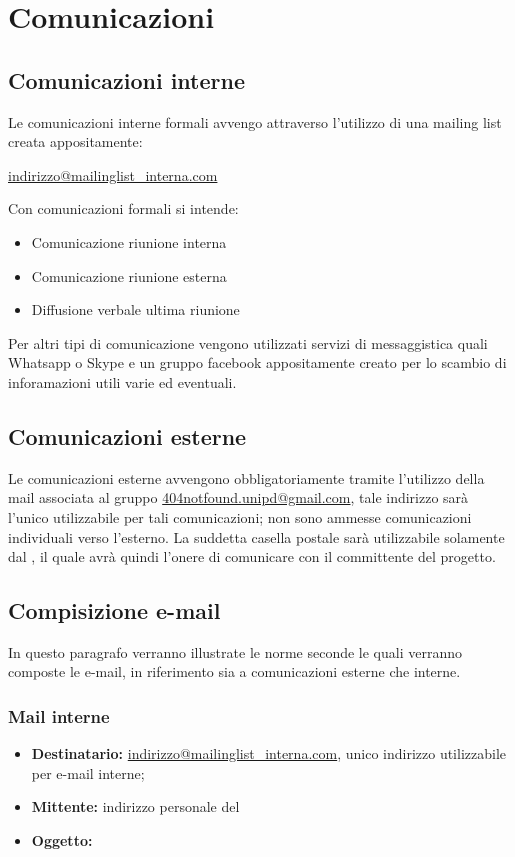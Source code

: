 \section{Comunicazioni}
\subsection{Comunicazioni interne}
Le comunicazioni interne formali avvengo attraverso l’utilizzo di una mailing list creata appositamente: 
\\
\begin{center}
	\href{mailto:indirizzo@mailinglist\_interna.com}{indirizzo@mailinglist\_interna.com}
\end{center}
Con comunicazioni formali si intende:
\begin{itemize}
	\item Comunicazione riunione interna
	\item Comunicazione riunione esterna
	\item Diffusione verbale ultima riunione
\end{itemize}

Per altri tipi di comunicazione vengono utilizzati servizi di messaggistica quali Whatsapp o Skype e un gruppo facebook appositamente creato per lo scambio di inforamazioni utili varie ed eventuali.

\subsection{Comunicazioni esterne}
Le comunicazioni esterne avvengono obbligatoriamente tramite l’utilizzo della mail associata al gruppo \href{404notfound.unipd@gmail.com}{404notfound.unipd@gmail.com}, tale indirizzo sarà l’unico utilizzabile per tali comunicazioni; non sono ammesse comunicazioni individuali verso l’esterno.
La suddetta casella postale sarà utilizzabile solamente dal \ruoloResponsabile, il quale avrà quindi l’onere di comunicare con il committente del progetto.

\subsection{Compisizione e-mail}
In questo paragrafo verranno illustrate le norme seconde le quali verranno composte le e-mail, in riferimento sia a comunicazioni esterne che interne.

\subsubsection{Mail interne}
\begin{itemize}
	\item \textbf{Destinatario:} \href{mailto:indirizzo@mailinglist\_interna.com}{indirizzo@mailinglist\_interna.com}, unico indirizzo utilizzabile per e-mail interne;
	\item \textbf{Mittente:} indirizzo personale del \ruoloResponsabile
	\item \textbf{Oggetto:} 
\end{itemize}




